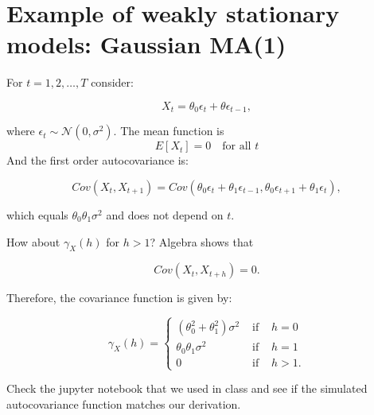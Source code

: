 \documentclass[12] {article}
\begin{document}
\section{Example of weakly stationary models: Gaussian MA(1)}

For $t=1,2, \ldots, T$ consider:

\[X_t = \theta_0 \epsilon_t + \theta \epsilon_{t-1},\]

\noindent where $\epsilon_{t} \sim \mathcal{N}(0,\sigma^2)$. The mean function is
\begin{equation}
E[X_t]=0 \quad \textrm{for all } t
\end{equation}
And the first order autocovariance is:

 \[ Cov(X_{t},X_{t+1}) = Cov(\theta_0\epsilon_{t} + \theta_1 \epsilon_{t-1}, \theta_0 \epsilon_{t+1} + \theta_1 \epsilon_{t}),  \]

\noindent which equals $\theta_0 \theta_1 \sigma^2$ and does not depend on $t$.

How about $\gamma_X(h)$ for $h>1$? Algebra shows that

\[ Cov(X_t, X_{t+h}) = 0.\]

\noindent Therefore, the covariance function is given by:

\[
\gamma_X(h) = \left\{
\begin{array}{ccc}
 (\theta_0^2 + \theta_1^2) \sigma^2  & \textrm { if }  & h=0   \\
\theta_0 \theta_1 \sigma^2  & \textrm{ if }  & h=1  \\
0  & \textrm{ if }  &  h>1.  
\end{array}
\right.
\]

\noindent Check the jupyter notebook that we used in class and see if the simulated autocovariance function matches our derivation. 
\end{document}
